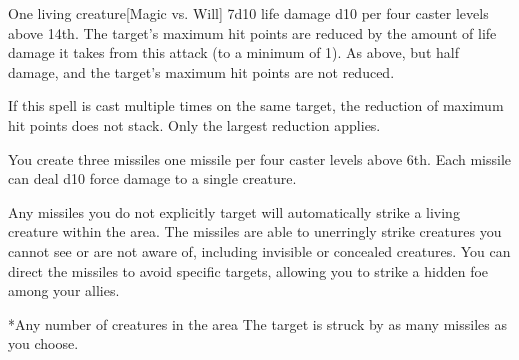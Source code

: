 \begin{spellheader}
    \spellrng{\rngmed}
\end{spellheader}
\begin{spelleffects}
    \begin{spelltarget}{One living creature}[Magic vs. Will]
        \spellsuccess 7d10 life damage \add d10 per four caster levels above 14th. The target's maximum hit points are reduced by the amount of life damage it takes from this attack (to a minimum of 1).
        \spellfailure As above, but half damage, and the target's maximum hit points are not reduced.
    \end{spelltarget}
\end{spelleffects}
\begin{spellfooter}
    \spellnotes If this spell is cast multiple times on the same target, the reduction of maximum hit points does not stack. Only the largest reduction applies.

    \cursespellnotes
\end{spellfooter}

\begin{spellheader}
\end{spellheader}
\begin{spelleffects}
    \spellspecial You create three missiles \add one missile per four caster levels above 6th. Each missile can deal d10 force damage to a single creature.

    Any missiles you do not explicitly target will automatically strike a living creature within the area. The missiles are able to unerringly strike creatures you cannot see or are not aware of, including invisible or concealed creatures. You can direct the missiles to avoid specific targets, allowing you to strike a hidden foe among your allies.
    \begin{spelltargets}*{Any number of creatures in the area}
        \spelleffect The target is struck by as many missiles as you choose.
    \end{spelltargets}
\end{spelleffects}
\begin{spellfooter}
    
\end{spellfooter}

